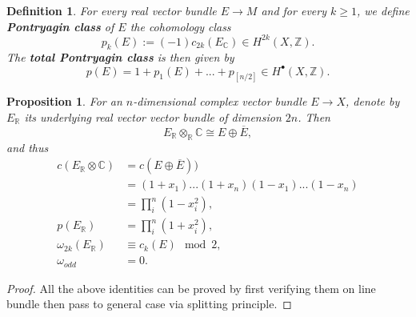 \documentclass[11pt]{article}
\newtheorem{prop}[thm]{Proposition}
\newtheorem{dfn}[thm]{Definition}
\newcommand{\reals}{\mathbb R}
\newcommand{\cplx}{\mathbb C}
\newcommand{\intg}{\mathbb Z}
\begin{document}
		\begin{dfn}
			For every real vector bundle $E\rightarrow M$ and for every $k\geq1$, we define \textbf{Pontryagin class} of $E$ the cohomology class
			\begin{equation*}
				p_k(E):=(-1)c_{2k}(E_\cplx)\in H^{2k}(X,\intg).
			\end{equation*}
			The \textbf{total Pontryagin class} is then given by
			\begin{equation*}
				p(E)=1+p_1(E)+...+p_{[n/2]}\in H^\bullet(X,\intg).
			\end{equation*}
		\end{dfn}
		\begin{prop}
			For an $n$-dimensional complex vector bundle $E\rightarrow X$, denote by $E_\reals$ its underlying real vector vector bundle of dimension $2n$. Then
			\begin{equation*}
				E_\reals\otimes_{\reals} \cplx\cong E\oplus\overline{E},
			\end{equation*}
			and thus
			\begin{equation*}
			\begin{aligned}
				c(E_\reals\otimes\cplx)&=c(E\oplus\overline{E}))\\
				&=(1+x_1)...(1+x_n)(1-x_1)...(1-x_n)\\
				&=\prod_i^n(1-x_i^2),\\
			p(E_{\reals} ) & =\prod_i^n(1+x_i^2),\\
			\omega_{2k}(E_\reals) & \equiv c_k(E) \mod 2,\\
			\omega_{odd}& =0.
			\end{aligned}
			\end{equation*}
		\end{prop}
		\begin{proof}
			All the above identities can be proved by first verifying them on line bundle then pass to general case via splitting principle.
		\end{proof}
\end{document}
